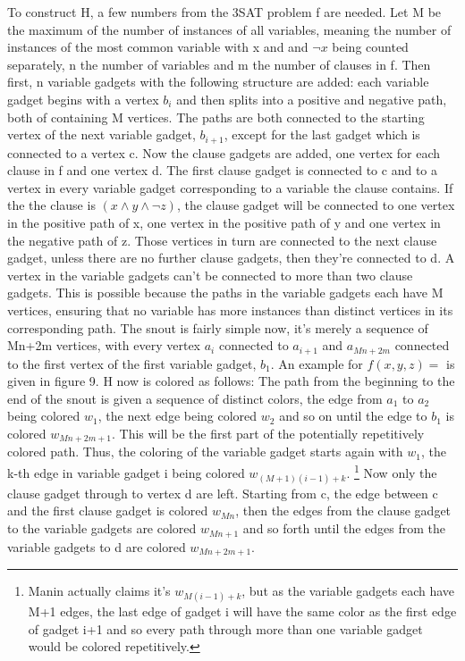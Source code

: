 \documentclass[12pt,a4paper]{article}
\begin{document}
To construct H, a few numbers from the 3SAT problem f are needed. Let M be the maximum of the  number of instances of all variables, meaning the number of instances of the most common variable with x and and $\neg x$ being counted separately, n the number of variables and m the number of clauses in f. Then first, n variable gadgets with the following structure are added: each variable gadget begins with a vertex $b_i$ and then splits into a positive and negative path, both of containing M vertices. The paths are both connected to the starting vertex of the next variable gadget, $b_{i+1}$, except for the last gadget which is connected to a vertex c. Now the clause gadgets are added, one vertex for each clause in f and one vertex d. The first clause gadget is connected to c and to a vertex in every variable gadget corresponding to a variable the clause contains. If the the clause is $(x \wedge y \wedge \neg z)$, the clause gadget will be connected to one vertex in the positive path of x, one vertex in the positive path of y and one vertex in the negative path of z. Those vertices in turn are connected to the next clause gadget, unless there are no further clause gadgets, then they're connected to d. A vertex in the variable gadgets can't be connected to more than two clause gadgets. This is possible because the paths in the variable gadgets each have M vertices, ensuring that no variable has more instances than distinct vertices in its corresponding path. The snout is fairly simple now, it's merely a sequence of Mn+2m vertices, with every vertex $a_i$ connected to $a_{i+1}$ and $a_{Mn+2m}$ connected to the first  vertex of the first variable gadget, $b_1$. An example for $f(x, y, z) = $ is given in figure 9. 
\newline
H now is colored as follows: The path from the beginning to the end of the snout is given a sequence of distinct colors, the edge from $a_1$ to $a_2$ being colored $w_1$, the next edge being colored $w_2$ and so on until the edge to $b_1$ is colored $w_{Mn+2m+1}$. This will be the first part of the potentially repetitively colored path. Thus, the coloring of the variable gadget starts again with $w_1$, the k-th edge in variable gadget i being colored $w_{(M+1)(i-1)+k}$. \footnote{Manin actually claims it's $w_{M(i-1)+k}$, but as the variable gadgets each have M+1 edges, the last edge of gadget i will have the same color as the first edge of gadget i+1 and so every path through more than one variable gadget would be colored repetitively.} Now only the clause gadget through to vertex d are left. Starting from c, the edge between c and the first clause gadget is colored $w_{Mn}$, then the edges from the clause gadget to the variable gadgets are colored $w_{Mn+1}$ and so forth until the edges from the variable gadgets to d are colored $w_{Mn+2m+1}$. 
\end{document}
